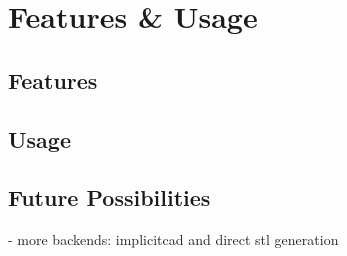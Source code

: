 
\chapter{Features {\&} Usage}

\label{ch:fetures}

\section{Features}\label{sec:features}


\section{Usage}\label{sec:usage}


\section{Future Possibilities}\label{sec:future}

- more backends: implicitcad and direct stl generation

